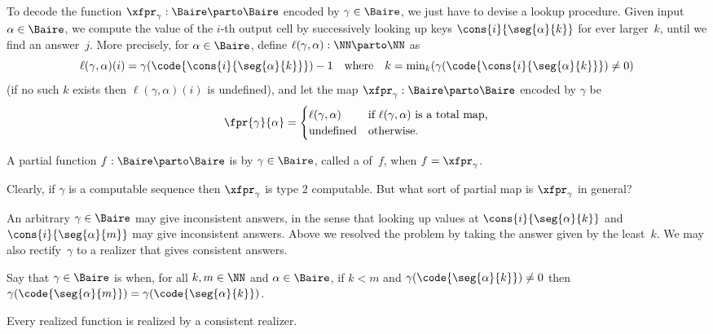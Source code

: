 To decode the function $\xfpr_\gamma : \Baire \parto \Baire$ encoded by $\gamma \in \Baire$, we just have to devise a lookup procedure. Given input $\alpha \in \Baire$, we compute the value of the $i$-th output cell by successively looking up keys $\cons{i}{\seg{\alpha}{k}}$ for ever larger~$k$, until we find an answer~$j$. More precisely,
for $\alpha \in \Baire$, define $\ell(\gamma, \alpha) : \NN \parto \NN$ as
%
\begin{equation*}
  \ell(\gamma, \alpha)(i) = \gamma(\code{\cons{i}{\seg{\alpha}{k}}}) - 1
  \quad\text{where}\quad
  k = \min\nolimits_k (\gamma(\code{\cons{i}{\seg{\alpha}{k}}}) \neq 0)
\end{equation*}
%
(if no such $k$ exists then $\ell(\gamma, \alpha)(i)$ is undefined), and let the map $\xfpr_\gamma : \Baire \parto \Baire$ encoded by $\gamma$ be
%
\begin{equation}
  \label{eq:type2-encoding}
  \fpr{\gamma}{\alpha} =
  \begin{cases}
    \ell(\gamma, \alpha) & \text{if $\ell(\gamma, \alpha)$ is a total map,} \\
    \text{undefined} & \text{otherwise.}
  \end{cases}
\end{equation}

\begin{definition}
  \label{def:type-2-realized}%
  A partial function $f : \Baire \parto \Baire$ is  by $\gamma \in \Baire$, called a  of~$f$, when $f = \xfpr_\gamma$.
\end{definition}

Clearly, if $\gamma$ is a computable sequence then $\xfpr_\gamma$ is type 2 computable.
But what sort of partial map is $\xfpr_\gamma$ in general?

An arbitrary $\gamma \in \Baire$ may give inconsistent answers, in the sense that looking up values at $\cons{i}{\seg{\alpha}{k}}$ and $\cons{i}{\seg{\alpha}{m}}$ may give inconsistent answers. Above we resolved the problem by taking the answer given by the least~$k$. We may also rectify~$\gamma$ to a realizer that gives consistent answers.

Say that $\gamma \in \Baire$ is  when, for all $k, m \in \NN$ and
$\alpha \in \Baire$, if $k < m$ and $\gamma(\code{\seg{\alpha}{k}}) \neq 0$ then
$\gamma(\code{\seg{\alpha}{m}}) = \gamma(\code{\seg{\alpha}{k}})$.

\begin{lemma}
  \label{lemma:normalized-BB}%
  Every realized function is realized by a consistent realizer.
\end{lemma}

